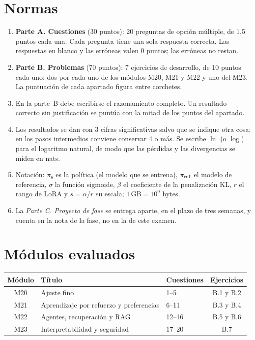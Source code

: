 \section*{Normas}
\begin{enumerate}[label=\arabic*.]
  \item \textbf{Parte A. Cuestiones} (30 puntos): 20 preguntas de opción múltiple, de 1,5 puntos cada una. Cada pregunta tiene una sola respuesta correcta. Las respuestas en blanco y las erróneas valen 0 puntos; las erróneas no restan.
  \item \textbf{Parte B. Problemas} (70 puntos): 7 ejercicios de desarrollo, de 10 puntos cada uno: dos por cada uno de los módulos M20, M21 y M22 y uno del M23. La puntuación de cada apartado figura entre corchetes.
  \item En la parte~B debe escribirse el razonamiento completo. Un resultado correcto sin justificación se puntúa con la mitad de los puntos del apartado.
  \item Los resultados se dan con 3 cifras significativas salvo que se indique otra cosa; en los pasos intermedios conviene conservar 4 o más. Se escribe $\ln$ (o $\log$) para el logaritmo natural, de modo que las pérdidas y las divergencias se miden en nats.
  \item Notación: $\pi_\theta$ es la política (el modelo que se entrena), $\pi_{\mathrm{ref}}$ el modelo de referencia, $\sigma$ la función sigmoide, $\beta$ el coeficiente de la penalización KL, $r$ el rango de LoRA y $s=\alpha/r$ su escala; $1\,\mathrm{GB}=10^{9}$ bytes.
  \item La \emph{Parte C. Proyecto de fase} se entrega aparte, en el plazo de tres semanas, y cuenta en la nota de la fase, no en la de este examen.
\end{enumerate}

\section*{Módulos evaluados}
\begin{center}
\begin{tabular}{@{}cllc@{}}
\toprule
Módulo & Título & Cuestiones & Ejercicios \\
\midrule
M20 & Ajuste fino & 1--5 & B.1 y B.2 \\
M21 & Aprendizaje por refuerzo y preferencias & 6--11 & B.3 y B.4 \\
M22 & Agentes, recuperación y RAG & 12--16 & B.5 y B.6 \\
M23 & Interpretabilidad y seguridad & 17--20 & B.7 \\
\bottomrule
\end{tabular}
\end{center}

